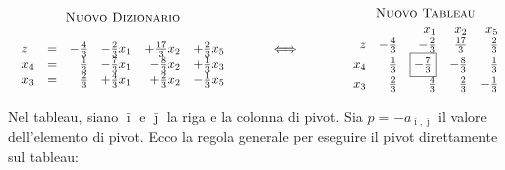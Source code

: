 \documentclass[10pt]{article}
\begin{document}
\[
   \begin{array}{c}
   \mbox{\sc Nuovo Dizionario}\\ \\
   \begin{array}{lcrrrr}
      z    &=& -\frac{4}{3} & -\frac{2}{3}x_1 & +\frac{17}{3}x_2 & +\frac{2}{3}x_5 \\   
      x_{4} &=& \frac{1}{3} & -\frac{7}{3}x_1 & -\frac{8}{3}x_2 & +\frac{1}{3}x_3 \\
      x_{3} &=& \frac{2}{3} & +\frac{4}{3}x_1 & +\frac{2}{3}x_2 & -\frac{1}{3}x_5 \\
   \end{array}
   \end{array}
\hfill
\hspace{1cm}
{\Huge \Longleftrightarrow}
\hfill
\hspace{1.2cm}
   \begin{array}{c}
   \mbox{\sc Nuovo Tableau}\\ 
   \begin{array}{rrrrr}
        &	 & x_1  & x_2 & x_5  \\
       z  &  -\frac{4}{3} &  -\frac{2}{3} & \frac{17}{3}  & \frac{2}{3} \\        
      x_4 &  \frac{1}{3} &  \fbox{$-\frac{7}{3}$} & -\frac{8}{3}   &  \frac{1}{3} \\
      x_3 & \frac{2}{3} &  \frac{4}{3}  &  \frac{2}{3}  &  -\frac{1}{3} \\
   \end{array}
   \end{array}
\]

Nel tableau, siano $\bar{\imath}$ e $\bar{\jmath}$
la riga e la colonna di pivot.
Sia $p= -a_{\bar{\imath},\bar{\jmath}}$ il valore dell'elemento di pivot.
Ecco la regola generale per
eseguire il pivot direttamente sul tableau:
\end{document}
